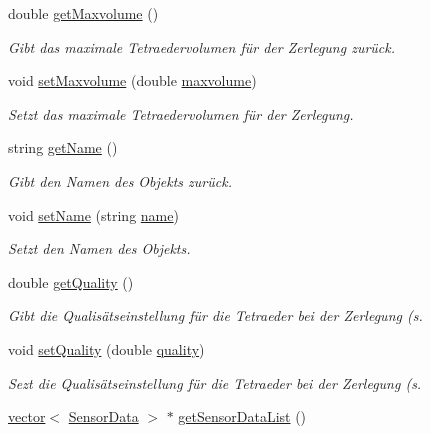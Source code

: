 \begin{DoxyCompactItemize}
double \hyperlink{classObjectData_a16a16a529f0e294e73cc05e585b81123}{get\-Maxvolume} ()
\begin{DoxyCompactList}\small\item\em Gibt das maximale Tetraedervolumen für der Zerlegung zurück. \end{DoxyCompactList}\item 
void \hyperlink{classObjectData_a9f98769226284127c529724acaf5d4c6}{set\-Maxvolume} (double \hyperlink{classObjectData_a5cc67da17022ec0f6eed6d02fa975a8b}{maxvolume})
\begin{DoxyCompactList}\small\item\em Setzt das maximale Tetraedervolumen für der Zerlegung. \end{DoxyCompactList}\item 
string \hyperlink{classObjectData_af2ba5c8a722ad3ba3ff25930cece3478}{get\-Name} ()
\begin{DoxyCompactList}\small\item\em Gibt den Namen des Objekts zurück. \end{DoxyCompactList}\item 
void \hyperlink{classObjectData_a9ae22360c1033fd4d019466d3361701d}{set\-Name} (string \hyperlink{classObjectData_a6d900f11952e9d50e6660a3695fad99d}{name})
\begin{DoxyCompactList}\small\item\em Setzt den Namen des Objekts. \end{DoxyCompactList}\item 
double \hyperlink{classObjectData_a8256cf002841401d4e4c7533d874fa5d}{get\-Quality} ()
\begin{DoxyCompactList}\small\item\em Gibt die Qualisätseinstellung für die Tetraeder bei der Zerlegung (s. \end{DoxyCompactList}\item 
void \hyperlink{classObjectData_a330b3d3fa607221fae87e26f60baa0e7}{set\-Quality} (double \hyperlink{classObjectData_ae047918932000aca3ff1bc680b288c08}{quality})
\begin{DoxyCompactList}\small\item\em Sezt die Qualisätseinstellung für die Tetraeder bei der Zerlegung (s. \end{DoxyCompactList}\item 
\hyperlink{classstd_1_1vector}{vector}$<$ \hyperlink{structUtils_1_1SensorData}{Sensor\-Data} $>$ $\ast$ \hyperlink{classObjectData_a72ac93213382f67b4d5b40c011eb1656}{get\-Sensor\-Data\-List} ()

\end{DoxyCompactItemize}
